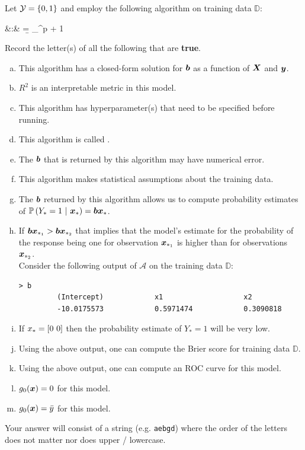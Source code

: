 \documentclass[12pt]{article}
\newcommand{\instr}{\small Your answer will consist of a string (e.g. \texttt{aebgd}) where the order of the letters does not matter nor does upper / lowercase. \normalsize}
\begin{document}

\problem [11min] Let $\mathcal{Y} = \left\{0,1\right\}$ and employ the following algorithm on training data $\mathbb{D}$:

\beqn
{} &:& \b = \argmin_{\w \in \reals^{p + 1}}
\eeqn

\benum

 Record the letter(s) of all the following that are \textbf{true}. 


\begin{enumerate}[(a)]
\item This algorithm has a closed-form solution for $\boldsymbol{b}$ as a function of $\boldsymbol{X}$ and $\boldsymbol{y}$.
\item $R^2$ is an interpretable metric in this model.
\item This algorithm has hyperparameter(s) that need to be specified before running.
\item This algorithm is called .
\item The $\boldsymbol{b}$ that is returned by this algorithm may have numerical error.
\item This algorithm makes statistical assumptions about the training data.
\item The $\boldsymbol{b}$ returned by this algorithm allows us to compute probability estimates of $\mathbb{P}\left(Y_* = 1~|~\boldsymbol{x}_*\right) = \boldsymbol{b}\boldsymbol{x}_*$.
\item If $\boldsymbol{b}\boldsymbol{x}_{*_1} > \boldsymbol{b}\boldsymbol{x}_{*_2}$ that implies that the model's estimate for the probability of the response being one for observation $\boldsymbol{x}_{*_1}$ is higher than for observations $\boldsymbol{x}_{*_2}$.\\

Consider the following output of $\mathcal{A}$ on the training data $\mathbb{D}$:
 
\begin{lstlisting}
> b
         (Intercept)            x1                   x2
         -10.0175573            0.5971474            0.3090818
\end{lstlisting}

\item If $x_* = \left[0~0\right]$ then the probability estimate of $Y_* = 1$ will be very low.
\item Using the above output, one can compute the Brier score for training data $\mathbb{D}$.
\item Using the above output, one can compute an ROC curve for this model.
\item $g_0(\boldsymbol{x}) = 0$ for this model.
\item $g_0(\boldsymbol{x}) = \bar{y}$ for this model.
\end{enumerate}
\eenum\instr\pagebreak
\end{document}
